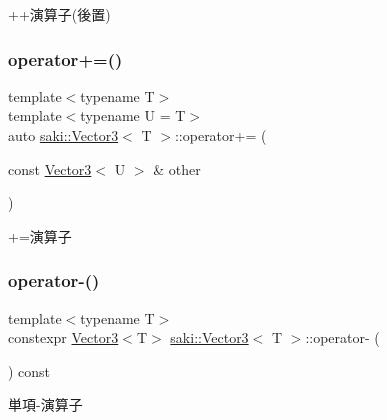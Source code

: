 ++演算子(後置) 

\mbox{\label{classsaki_1_1_vector3_a99b24e43486d76b449b23239c80f70d7}} 
\subsubsection{\texorpdfstring{operator+=()}{operator+=()}}
{\footnotesize\ttfamily template$<$typename T$>$ \\
template$<$typename U  = T$>$ \\
auto \mbox{\hyperlink{classsaki_1_1_vector3}{saki\+::\+Vector3}}$<$ T $>$\+::operator+= (\begin{DoxyParamCaption}\item[{const \mbox{\hyperlink{classsaki_1_1_vector3}{Vector3}}$<$ U $>$ \&}]{other }\end{DoxyParamCaption})\hspace{0.3cm}{\ttfamily [inline]}}



+=演算子 

\mbox{\label{classsaki_1_1_vector3_ae030be03f3693adbec73a95f5c37ed18}} 
\subsubsection{\texorpdfstring{operator-\/()}{operator-()}}
{\footnotesize\ttfamily template$<$typename T$>$ \\
constexpr \mbox{\hyperlink{classsaki_1_1_vector3}{Vector3}}$<$T$>$ \mbox{\hyperlink{classsaki_1_1_vector3}{saki\+::\+Vector3}}$<$ T $>$\+::operator-\/ (\begin{DoxyParamCaption}{ }\end{DoxyParamCaption}) const\hspace{0.3cm}{\ttfamily [inline]}}



単項-\/演算子 

\mbox{\label{classsaki_1_1_vector3_a0811320313e336ec3182422ca4c726f6}} 
